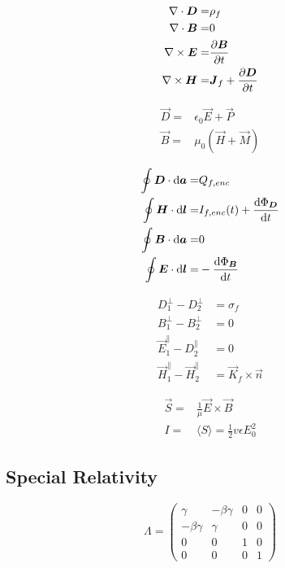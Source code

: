 \begin{align*}
    \nabla\cdot\boldsymbol{D} =& \rho_{f} \\
    \nabla\cdot\boldsymbol{B} =& 0 \\
    \nabla \times \boldsymbol{E} =& \frac{\partial \boldsymbol{B}}{\partial t} \\
    \nabla \times \boldsymbol{H} =& \boldsymbol{J}_{f} + \frac{\partial \boldsymbol{D}}{\partial t}
\end{align*}

\begin{align*}
    \vec{D} =& \epsilon_{0}\vec{E} + \vec{P} \\
    \vec{B} =& \mu_{0}(\vec{H} + \vec{M})
\end{align*}

\begin{align*}
    \oint \boldsymbol{D} \cdot \mathrm{d}\boldsymbol{a} =& Q_{f,enc} \\
    \oint \boldsymbol{H} \cdot \mathrm{d}\boldsymbol{l} =& I_{f,enc}(t) + \frac{\mathrm{d} \Phi_{\boldsymbol{D}}}{\mathrm{d} t} \\
    \oint \boldsymbol{B} \cdot \mathrm{d}\boldsymbol{a} =& 0\\
    \oint \boldsymbol{E} \cdot \mathrm{d}\boldsymbol{l} =& - \frac{\mathrm{d} \Phi_{\boldsymbol{B}}}{\mathrm{d} t}
\end{align*}

\begin{align*}
    D_{1}^{\perp} - D_{2}^{\perp} &= \sigma_{f} \\
    B_{1}^{\perp} - B_{2}^{\perp} &= 0 \\
    \vec{E}_{1}^{\parallel} - D_{2}^{\parallel} &= 0 \\
    \vec{H}_{1}^{\parallel} - \vec{H}_{2}^{\parallel} &= \vec{K}_f \times \hat{\vec{n}}
\end{align*}

\begin{align*}
    \vec{S} =& \frac{1}{\mu} \vec{E} \times \vec{B} \\
    I =& \langle S \rangle = \frac{1}{2} v\epsilon E_{0}^{2}
\end{align*}

\subsection{Special Relativity}
\begin{equation*}
    \Lambda =
    \begin{pmatrix}
        \gamma & -\beta\gamma & 0 & 0 \\
        -\beta\gamma & \gamma & 0 & 0 \\
        0 & 0 & 1 & 0 \\
        0 & 0 & 0 & 1
    \end{pmatrix}
\end{equation*}

